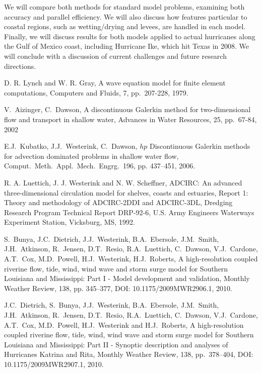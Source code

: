 We will compare both methods 
for standard model problems, examining both accuracy and parallel
efficiency.  We will also discuss how features particular to coastal regions, such as wetting/drying and levees, are handled in each model. Finally, we will discuss results for
both models  applied to actual hurricanes
along the Gulf of Mexico coast, including Hurricane Ike, which hit Texas 
in 2008.  We will conclude with a discussion of current challenges and future research
directions.




\begin{thebibliography}{10}

 D. R. Lynch and W. R. Gray, A wave equation model for finite element computations, Computers and Fluids, 7, pp.\ 207-228, 1979.  

 V.~Aizinger, C.~Dawson, A discontinuous Galerkin
method for two-dimensional flow and transport in shallow water,
Advances in Water Resources, 25, pp.\ 67-84, 2002

 E.J.~Kubatko, J.J.~Westerink, C.~Dawson, $hp$ Discontinuous Galerkin methods for advection dominated problems in shallow water flow, Comput.~Meth.~Appl.~Mech.~Engrg.~196, pp. 437--451, 2006.

 R. A. Luettich, J. J. Westerink and N. W. Scheffner, 
ADCIRC: An advanced three-dimensional circulation model for shelves, coasts and estuaries, Report 1: Theory and methodology of ADCIRC-2DDI and ADCIRC-3DL, Dredging Research Program Technical Report DRP-92-6, U.S. Army Engineers Waterways Experiment Station, Vicksburg, MS, 1992.  


 S.~Bunya, J.C.~Dietrich, J.J.~Westerink, B.A.~Ebersole, J.M.~Smith,  J.H.~Atkinson, R.~Jensen, D.T.~Resio, R.A.~Luettich, C.~Dawson, V.J.~Cardone, A.T.~Cox, M.D.~Powell, H.J.~Westerink, H.J.~Roberts, A high-resolution coupled riverine flow, tide, wind, wind wave and storm surge model for Southern Louisiana and Mississippi: Part I - Model development and validation, Monthly Weather Review, 138, pp. 345--377, DOI: 10.1175/2009MWR2906.1, 2010.  


 J.C.~Dietrich, S.~Bunya, J.J.~Westerink, B.A.~Ebersole, J.M.~Smith,  J.H.~Atkinson, R.~Jensen, D.T.~Resio, R.A.~Luettich, C.~Dawson, V.J.~Cardone, A.T.~Cox, M.D.~Powell, H.J.~Westerink and H.J.~Roberts, A high-resolution coupled riverine flow, tide, wind, wind wave and storm surge model for Southern Louisiana and Mississippi: Part II - Synoptic description and analyses of Hurricanes Katrina and Rita, Monthly Weather Review, 138, pp.\ 378--404, DOI: 10.1175/2009MWR2907.1, 2010.


\end{thebibliography}
